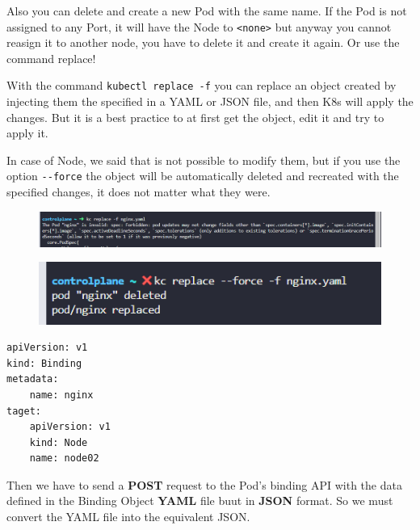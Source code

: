 \documentclass{article}
\newenvironment{blocktemplate}[1]{%
    \tcolorbox[beamer,%
    noparskip,breakable,
    colframe=Blue,%
    colbacklower=LimeGreen!75!LightGreen,%
    title=#1]}%
    {\endtcolorbox}
\newenvironment{blocktemplateIII}[1]{%
    \tcolorbox[beamer,%
    noparskip,breakable,
    ,colframe=Red,%
    colbacklower=LimeGreen!75!LightGreen,%
    title=#1]}%
    {\endtcolorbox}
\newenvironment{codetemplate}[1][]{%
  \mybasecolorbox[#1]
  \itshape
}{%
  \endmybasecolorbox
}
\begin{document}
\begin{blocktemplate}{NOTE:}
Also you can delete and create a new Pod with the same name. If the Pod is not assigned to any Port, it will have the Node to \verb|<none>| but anyway you cannot reasign it to another node, you have to delete it and create it again. Or use the command replace!
\end{blocktemplate}

\begin{blocktemplateIII}{NOTE:}
With the command \verb|kubectl replace -f| you can replace an object created by injecting them the specified in a YAML or JSON file, and then K8s will apply the changes. But it is a best practice to at first get the object, edit it and try to apply it.

In case of Node, we said that is not possible to modify them, but if you use the option \verb|--force| the object will be automatically deleted and recreated with the specified changes, it does not matter what they were.
\begin{figure}[H]
    \centering
    \includegraphics[width=\textwidth]{pictures/sch1.png}
\end{figure}
\begin{figure}[H]
    \centering
    \includegraphics[scale=0.6]{pictures/sch2.png}
\end{figure}
\end{blocktemplateIII}

\begin{codetemplate}{}
\begin{verbatim}
apiVersion: v1
kind: Binding
metadata:
    name: nginx
taget:
    apiVersion: v1
    kind: Node
    name: node02
\end{verbatim}
\end{codetemplate}

Then we have to send a \textbf{POST} request to the Pod's binding API with the data defined in the Binding Object \textbf{YAML} file buut in \textbf{JSON} format. So we must convert the YAML file into the equivalent JSON.
\end{document}

